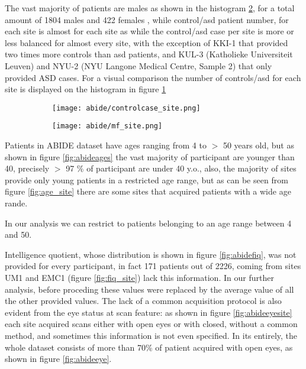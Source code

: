 \documentclass[a4paper,11pt]{article}
\begin{document}
The vast majority of patients are males as shown in the histogram \ref{fig:mf_site}, for a total amount of 1804 males and 422 females , while control/asd patient number, for each site is almost  for each site as
while the control/asd case per site is more or less balanced for almost every site, with the exception of KKI-1 that provided two times more controls than asd patients, and KUL-3 (Katholieke Universiteit Leuven) and NYU-2 (NYU Langone Medical Centre, Sample 2) that only provided ASD cases. For a visual comparison the number of controls/asd for each site is displayed on the histogram in figure \ref{fig:controlcase_site}

\begin{figure}[h]
\centering
\begin{subfigure}{0.9\textwidth}
\texttt{[image: abide/controlcase\_site.png]}
\caption{}
\label{fig:controlcase_site}
\end{subfigure}
\begin{subfigure}{0.9\textwidth}
\texttt{[image: abide/mf\_site.png]}
\caption{}
\label{fig:mf_site}
\end{subfigure}
\caption{}
\label{}
\end{figure}


Patients in ABIDE dataset have ages ranging from 4 to $>$ 50 years old, but as shown in figure \ref{fig:abideages} the vast majority of participant are younger than 40, precisely $>$ 97 $\%$ of participant are under 40 y.o., also, the majority of sites provide only young patients in a restricted age range, but  as can be seen from figure \ref{fig:age_site} there are some sites that acquired patients with a wide age rande.

In our analysis we can restrict to patients belonging to an age range between 4 and 50.

Intelligence quotient, whose distribution is shown in figure \ref{fig:abidefiq}, was not provided for every participant, in fact 171 patients out of 2226, coming from sites UM1 and EMC1 (figure \ref{fig:fiq_site}) lack this information.
In our further analysis, before proceding these values were replaced by the average value of all the other provided values.
The lack of a common acquisition protocol is also evident from the eye status at scan feature: as shown in figure \ref{fig:abideeyesite} each site acquired scans either with open eyes or with closed, without a common method, and sometimes this information is not even specified.
In its entirely, the whole dataset consists of more than 70\% of patient acquired with open eyes, as shown in figure \ref{fig:abideeye}.
\end{document}
